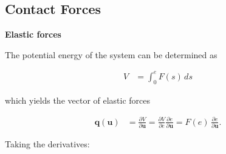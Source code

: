 \subsection{Contact Forces}

\textbf{Elastic forces}

The potential energy of the system can be determined as

\begin{align*}
V &= \int_{0}^{e}F(s)\,ds
\end{align*}

which yields the vector of elastic forces

\begin{align}
\boldsymbol{q}(\boldsymbol{u}) &= \frac{\partial V}{\partial \boldsymbol{u}} = \frac{\partial V}{\partial e}\frac{\partial e}{\partial \boldsymbol{u}} = F(e)\,\frac{\partial e}{\partial \boldsymbol{u}}.
\end{align}

Taking the derivatives:

